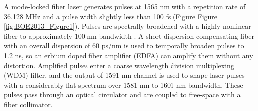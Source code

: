 A mode-locked fiber laser generates pulses at 1565 nm with a repetition rate of 36.128 MHz and a pulse width slightly less than 100 fs (Figure Figure \ref{fig:BOE2013_Figure1}). Pulses are spectrally broadened with a highly nonlinear fiber to approximately 100 nm bandwidth \cite{boyraz2000broadband}. A short dispersion compensating fiber with an overall dispersion of 60 ps/nm is used to temporally broaden pulses to 1.2 ns, so an erbium doped fiber amplifier (EDFA) can amplify them without any distortion. Amplified pulses enter a coarse wavelength division multiplexing (WDM) filter, and the output of 1591 nm channel is used to shape laser pulses with a considerably flat spectrum over 1581 nm to 1601 nm bandwidth. These pulses pass through an optical circulator and are coupled to free-space with a fiber collimator.

